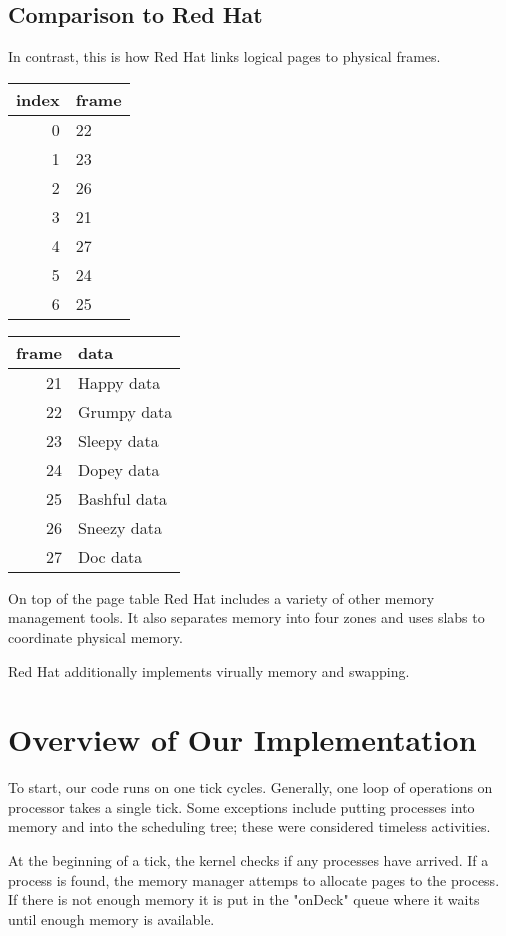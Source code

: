 \documentclass[12pt]{article}
\begin{document}
\subsection{Comparison to Red Hat}
In contrast, this is how Red Hat links logical pages to physical frames.
\begin{center}
	\begin{tabular}{|r |  l |}
		\hline
		index & frame \\\hline\hline
		0 & 22\\\hline
		1 & 23 \\\hline
		2 & 26 \\\hline
		3 & 21 \\\hline
		4 & 27 \\\hline
		5 & 24 \\\hline
		6 & 25 \\\hline
	\end{tabular}   
	\begin{tabular}{|r |  l |}
		\hline
		frame & data \\\hline\hline
		21 & Happy data\\\hline
		22 & Grumpy data \\\hline
		23 & Sleepy data \\\hline
		24 & Dopey data \\\hline
		25 & Bashful data \\\hline
		26 & Sneezy data \\\hline
		27 & Doc data \\\hline
	\end{tabular}
\end{center}

On top of the page table Red Hat includes a variety of other memory management tools. It also separates memory into four zones and uses slabs to coordinate physical memory. 

Red Hat additionally implements virually memory and swapping.

\section{Overview of Our Implementation}
To start, our code runs on one tick cycles. Generally, one loop of operations on processor takes a single tick. Some exceptions include putting processes into memory and into the scheduling tree; these were considered timeless activities.

At the beginning of a tick, the kernel checks if any processes have arrived. If a process is found, the memory manager attemps to allocate pages to the process. If there is not enough memory it is put in the "onDeck" queue where it waits until enough memory is available.
\end{document}
